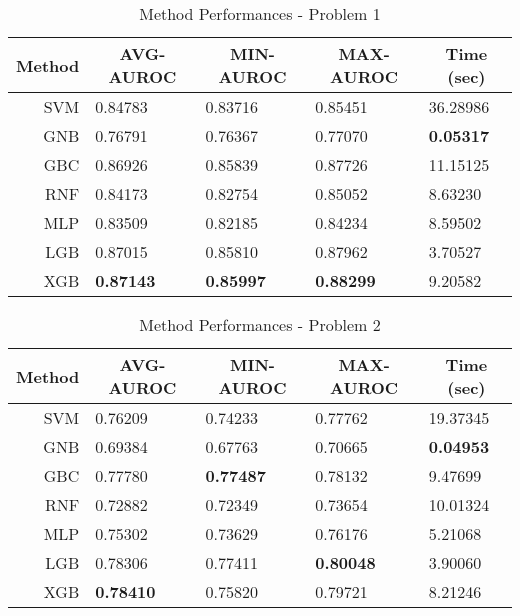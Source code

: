 \documentclass[11pt,reqno]{amsart}
\begin{document}
\begin{table}[h]
\begin{tabular}{|c|l|l|l|l|}
\hline
Method & \multicolumn{1}{c|}{AVG-AUROC} & \multicolumn{1}{c|}{MIN-AUROC} & \multicolumn{1}{c|}{MAX-AUROC} & \multicolumn{1}{c|}{Time (sec)} \\ \hline
\multicolumn{1}{|r|}{SVM} & 0.84783 & 0.83716 & 0.85451 & 36.28986 \\ \hline
\multicolumn{1}{|r|}{GNB} & 0.76791 & 0.76367 & 0.77070 & \textbf{0.05317} \\ \hline
\multicolumn{1}{|r|}{GBC} & 0.86926 & 0.85839 & 0.87726 & 11.15125 \\ \hline
\multicolumn{1}{|r|}{RNF} & 0.84173 & 0.82754 & 0.85052 & 8.63230 \\ \hline
\multicolumn{1}{|r|}{MLP} & 0.83509 & 0.82185 & 0.84234 & 8.59502 \\ \hline
\multicolumn{1}{|r|}{LGB} & 0.87015 & 0.85810 & 0.87962 & 3.70527 \\ \hline
\multicolumn{1}{|r|}{XGB} & \textbf{0.87143} & \textbf{0.85997} & \textbf{0.88299} & 9.20582 \\ \hline
\end{tabular}
\caption{Method Performances - Problem 1}
\label{tab:perf1}
\end{table}
\begin{table}[h]
\begin{tabular}{|c|l|l|l|l|}
\hline
Method & \multicolumn{1}{c|}{AVG-AUROC} & \multicolumn{1}{c|}{MIN-AUROC} & \multicolumn{1}{c|}{MAX-AUROC} & \multicolumn{1}{c|}{Time (sec)} \\ \hline
\multicolumn{1}{|r|}{SVM} & 0.76209 & 0.74233 & 0.77762 & 19.37345 \\ \hline
\multicolumn{1}{|r|}{GNB} & 0.69384 & 0.67763 & 0.70665 & \textbf{0.04953} \\ \hline
\multicolumn{1}{|r|}{GBC} & 0.77780 & \textbf{0.77487} & 0.78132 & 9.47699 \\ \hline
\multicolumn{1}{|r|}{RNF} & 0.72882 & 0.72349 & 0.73654 & 10.01324 \\ \hline
\multicolumn{1}{|r|}{MLP} & 0.75302 & 0.73629 & 0.76176 & 5.21068 \\ \hline
\multicolumn{1}{|r|}{LGB} & 0.78306 & 0.77411 & \textbf{0.80048} & 3.90060 \\ \hline
\multicolumn{1}{|r|}{XGB} & \textbf{0.78410} & 0.75820 & 0.79721 & 8.21246 \\ \hline
\end{tabular}
\caption{Method Performances - Problem 2}
\label{tab:perf2}
\end{table}
\end{document}
